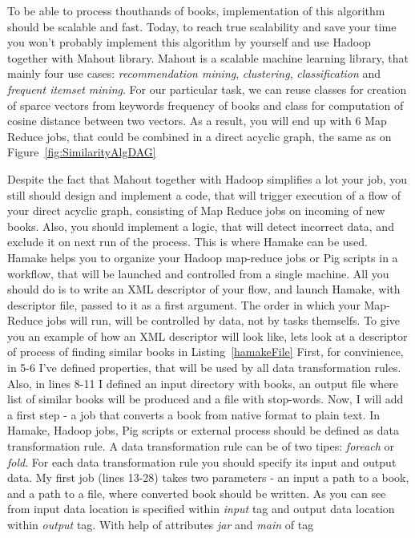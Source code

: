 \documentclass{article}
\begin{document}
To be able to process thouthands of books, implementation of this algorithm should be scalable and fast.
Today, to reach true scalability and save your time you won't probably implement this algorithm by yourself and 
use Hadoop together with Mahout\cite{Mahout} library. 
Mahout is a scalable machine learning library, that mainly four use cases: \textit{recommendation mining}, \textit{clustering},
\textit{classification} and \textit{frequent itemset mining}. For our particular task, we can reuse classes
for creation of sparce vectors from keywords frequency of books and class for computation of cosine distance between two vectors. 
As a result, you will end up with 6 Map Reduce jobs, that could be combined in a direct acyclic graph, the same as on Figure~\ref{fig:SimilarityAlgDAG}

Despite the fact that Mahout together with Hadoop simplifies a lot your job, you still should design and implement a code, that
will trigger execution of a flow of your direct acyclic graph, consisting of Map Reduce jobs on incoming of new books. Also, you should implement a logic,
that will detect incorrect data, and exclude it on next run of the process. This is where Hamake can be used. Hamake helps you to organize 
your Hadoop map-reduce jobs or Pig scripts in a workflow, that will be launched and controlled from a single machine. 
All you should do is to write an XML descriptor of your flow, and launch Hamake, with descriptor file, passed to it as a first argument. The order
in which your Map-Reduce jobs will run, will be controlled by data, not by tasks themselfs. 
To give you an example of how an XML descriptor will look like, lets look at a descriptor of process of finding similar books in Listing~\ref{hamakeFile}
First, for convinience, in 5-6 I've defined properties, that will be used by all data transformation rules. Also, in lines 8-11 I defined
an input directory with books, an output file where list of similar books will be produced and a file with stop-words.
Now, I will add a first step - a job that converts a book from native format to plain text. In Hamake, Hadoop jobs, Pig scripts or external process should be
defined as data transformation rule. A data transformation rule can be of two tipes: \textit{foreach} or \textit{fold}. For each data transformation rule you should 
specify its input and output data. My first job (lines 13-28) takes two parameters - an input a path to a book, and a path to a file, where converted book should be written. 
As you can see from input data location is specified within \textit{input} tag and output data location within \textit{output} tag. With help of attributes \textit{jar} and \textit{main} of tag 
\end{document}
